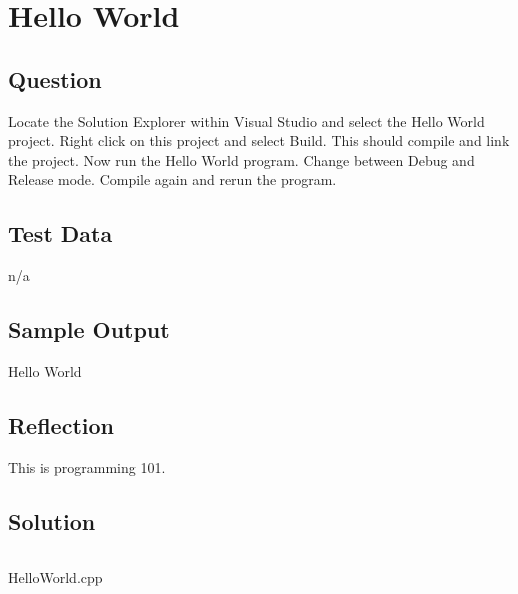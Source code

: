 \section{Hello World}
    \subsection*{Question}
        Locate the Solution Explorer within Visual Studio and select the Hello World project. Right click on this project and select Build. This should compile and link the project. Now run the Hello World program.
        Change between Debug and Release mode. Compile again and rerun the program.

    \subsection*{Test Data}
        n/a

    \subsection*{Sample Output}
        Hello World

    \subsection*{Reflection}
        This is programming 101.
        
    \subsection*{Solution}
        \begin{listing}[H]
            \inputminted{cpp}{../Tasks/01-HelloWorld/HelloWorld.cpp}
            \caption{HelloWorld.cpp}
        \end{listing}